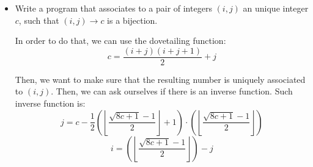 \documentclass[]{scrartcl}
\begin{document}
\begin{itemize}
\item  Write a program that associates to a pair of integers $(i,j)$ an unique integer 
$c$, such that $(i,j)\to c$ is a bijection.

In order to do that, we can use the dovetailing function:
\[c = \frac{(i+j)(i+j+1)}{2} + j\]

Then, we want to make sure that the resulting number is uniquely associated to $(i,j)$. Then, we can ask ourselves if there is an inverse function. Such inverse function is:
\[j = c - \frac{1}{2}\left(\left\lfloor\frac{\sqrt{8c+1}-1}{2}\right\rfloor + 1\right) \cdot\left(\left\lfloor\frac{\sqrt{8c+1}-1}{2}\right\rfloor\right)\]
\[i = \left(\left\lfloor\frac{\sqrt{8c+1}-1}{2}\right\rfloor\right)-j\]
\end{itemize}
\end{document}
